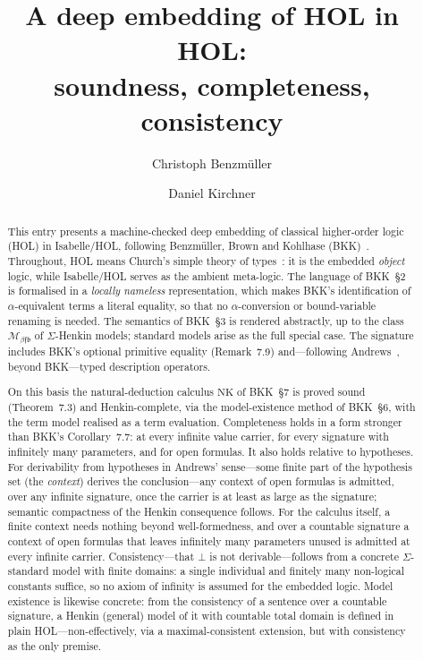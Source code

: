 \documentclass[11pt,a4paper]{article}
\begin{document}
\title{A deep embedding of HOL in HOL:\\ soundness, completeness, consistency}
\author{Christoph Benzm\"uller \and Daniel Kirchner}
\maketitle
\begin{abstract}
This entry presents a machine-checked deep embedding of classical
higher-order logic (HOL) in Isabelle/HOL, following Benzm\"uller, Brown
and Kohlhase (BKK)~\cite{BBK04}.  Throughout, HOL means Church's simple
theory of types~\cite{Church40}: it is the embedded \emph{object} logic,
while Isabelle/HOL serves as the ambient meta-logic.  The language of
BKK~\S2 is formalised in a \emph{locally nameless} representation, which
makes BKK's identification of $\alpha$-equivalent terms a literal
equality, so that no $\alpha$-conversion or bound-variable renaming is
needed.  The semantics of BKK~\S3 is rendered abstractly, up to the
class $\mathcal{M}_{\beta\mathfrak{f}\mathfrak{b}}$ of $\Sigma$-Henkin
models; standard models arise as the full special case.  The signature
includes BKK's optional primitive equality (Remark~7.9) and---following
Andrews~\cite{Andrews72}, beyond BKK---typed description operators.

On this basis the natural-deduction calculus $\mathrm{NK}$ of BKK~\S7 is
proved sound (Theorem~7.3) and Henkin-complete, via the model-existence
method of BKK~\S6, with the term model realised as a term evaluation.
Completeness holds in a form stronger than BKK's Corollary~7.7: at every
infinite value carrier, for every signature with infinitely many
parameters, and for open formulas.  It also holds relative to
hypotheses.  For derivability from hypotheses in Andrews' sense---some
finite part of the hypothesis set (the \emph{context}) derives the
conclusion---any context of open formulas is admitted, over any infinite
signature, once the carrier is at least as large as the signature;
semantic compactness of the Henkin consequence follows.  For the
calculus itself, a finite context needs nothing beyond well-formedness,
and over a countable signature a context of open formulas that leaves
infinitely many parameters unused is admitted at every infinite
carrier.  Consistency---that $\bot$ is not derivable---follows from a
concrete $\Sigma$-standard model with finite domains: a single
individual and finitely many non-logical constants suffice, so no axiom
of infinity is assumed for the embedded logic.  Model existence is
likewise concrete: from the consistency of a sentence over a countable
signature, a Henkin (general) model of it with countable total domain
is defined in plain HOL---non-effectively, via a maximal-consistent
extension, but with consistency as the only premise.


\end{abstract}
\end{document}
